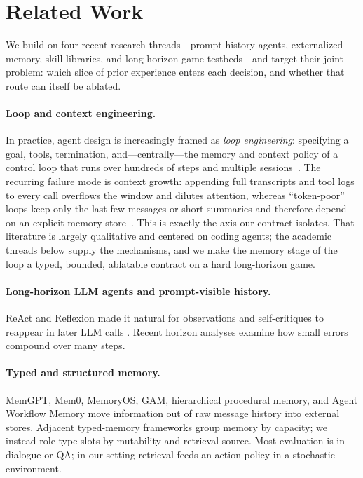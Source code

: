 \section{Related Work}
\label{sec:related}


We build on four recent research threads---prompt-history agents,
externalized memory, skill libraries, and long-horizon game
testbeds---and target their joint problem: which slice of prior
experience enters each decision, and whether that route can itself
be ablated.

\paragraph{Loop and context engineering.}
In practice, agent design is increasingly framed as \emph{loop
engineering}: specifying a goal, tools, termination, and---centrally---the
memory and context policy of a control loop that runs over hundreds of
steps and multiple sessions~\citep{anthropic-context-2025}. The recurring
failure mode is context growth: appending full transcripts and tool logs
to every call overflows the window and dilutes attention, whereas
``token-poor'' loops keep only the last few messages or short summaries
and therefore depend on an explicit memory store~\citep{memory-survey-2025}.
This is exactly the axis our contract isolates. That literature is largely
qualitative and centered on coding agents; the academic threads below
supply the mechanisms, and we make the memory stage of the loop a typed,
bounded, ablatable contract on a hard long-horizon game.

\paragraph{Long-horizon LLM agents and prompt-visible history.}
ReAct and Reflexion made it natural for observations and
self-critiques to reappear in later LLM
calls \citep{react2023,reflexion2023}. Recent horizon analyses
\citep{sinha-horizon-2026,wang-planning-2026,horizon-mirage-2026,%
kwa-metr-2025} examine how small errors compound over many steps.

\paragraph{Typed and structured memory.}
MemGPT, Mem0, MemoryOS, GAM, hierarchical procedural memory, and
Agent Workflow Memory \citep{memgpt2024,mem0-2025,memoryos2025,%
gam-2026,macla-2025,awm-2025} move information out of raw message
history into external stores. Adjacent typed-memory frameworks
\citep{coala-2024,generative-agents-2023,a-mem-2025} group memory
by capacity; we instead role-type slots by mutability and retrieval
source. Most evaluation is in dialogue or QA; in our setting
retrieval feeds an action policy in a stochastic environment.

